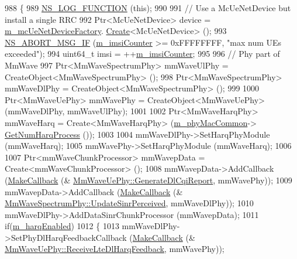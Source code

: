 \begin{DoxyCode}
988 \{
989         \hyperlink{log-macros-disabled_8h_a90b90d5bad1f39cb1b64923ea94c0761}{NS\_LOG\_FUNCTION} (\textcolor{keyword}{this});
990 
991         \textcolor{comment}{// Use a McUeNetDevice but install a single RRC}
992         Ptr<McUeNetDevice> device = \hyperlink{classns3_1_1MmWaveHelper_a678f7c6a79f1024bf09a2dc561ae87f5}{m\_mcUeNetDeviceFactory}.
      \hyperlink{classns3_1_1ObjectFactory_a18152e93f0a6fe184ed7300cb31e9896}{Create}<McUeNetDevice> ();
993         \hyperlink{group__fatal_ga6653324225bc139e46deea177614ceee}{NS\_ABORT\_MSG\_IF} (\hyperlink{classns3_1_1MmWaveHelper_a72100c1c951aa5dcc5b634749e2bb930}{m\_imsiCounter} >= 0xFFFFFFFF, \textcolor{stringliteral}{"max num UEs exceeded"});
994         uint64\_t imsi = ++\hyperlink{classns3_1_1MmWaveHelper_a72100c1c951aa5dcc5b634749e2bb930}{m\_imsiCounter};
995 
996         \textcolor{comment}{// Phy part of MmWave}
997         Ptr<MmWaveSpectrumPhy> mmWaveUlPhy = CreateObject<MmWaveSpectrumPhy> ();
998         Ptr<MmWaveSpectrumPhy> mmWaveDlPhy = CreateObject<MmWaveSpectrumPhy> ();
999 
1000         Ptr<MmWaveUePhy> mmWavePhy = CreateObject<MmWaveUePhy> (mmWaveDlPhy, mmWaveUlPhy);
1001 
1002         Ptr<MmWaveHarqPhy> mmWaveHarq = Create<MmWaveHarqPhy> (\hyperlink{classns3_1_1MmWaveHelper_a6aaa35de743b9a88998de0128b1046b4}{m\_phyMacCommon}->
      \hyperlink{classns3_1_1MmWavePhyMacCommon_a40773d84172ebeb5aff125f56ebcc5ac}{GetNumHarqProcess} ());
1003         
1004         mmWaveDlPhy->SetHarqPhyModule (mmWaveHarq);
1005         mmWavePhy->SetHarqPhyModule (mmWaveHarq);
1006 
1007         Ptr<mmWaveChunkProcessor> mmWavepData = Create<mmWaveChunkProcessor> ();
1008         mmWavepData->AddCallback (\hyperlink{group__makecallbackmemptr_ga9376283685aa99d204048d6a4b7610a4}{MakeCallback} (&
      \hyperlink{classns3_1_1MmWaveUePhy_a94ad8ac60220078f5b5928018fb0e933}{MmWaveUePhy::GenerateDlCqiReport}, mmWavePhy));
1009         mmWavepData->AddCallback (\hyperlink{group__makecallbackmemptr_ga9376283685aa99d204048d6a4b7610a4}{MakeCallback} (&
      \hyperlink{classns3_1_1MmWaveSpectrumPhy_ad00477c4185055c7fb2b717bb42fd668}{MmWaveSpectrumPhy::UpdateSinrPerceived}, mmWaveDlPhy));
1010         mmWaveDlPhy->AddDataSinrChunkProcessor (mmWavepData);
1011         \textcolor{keywordflow}{if}(\hyperlink{classns3_1_1MmWaveHelper_a56142ee76b853ab0fa13918aeb6800e9}{m\_harqEnabled})
1012         \{
1013                 mmWaveDlPhy->SetPhyDlHarqFeedbackCallback (\hyperlink{group__makecallbackmemptr_ga9376283685aa99d204048d6a4b7610a4}{MakeCallback} (&
      \hyperlink{classns3_1_1MmWaveUePhy_ac00ac37c527f89a4e7a585cef8b95f4d}{MmWaveUePhy::ReceiveLteDlHarqFeedback}, mmWavePhy));

\end{DoxyCode}
